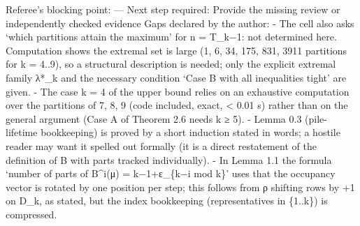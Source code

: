 Referee's blocking point: --- Next step required: Provide the missing
review or independently checked evidence Gaps declared by the author: -
The cell also asks `which partitions attain the maximum' for n = T\_k−1:
not determined here. Computation shows the extremal set is large (1, 6,
34, 175, 831, 3911 partitions for k = 4..9), so a structural description
is needed; only the explicit extremal family λ*\_k and the necessary
condition `Case B with all inequalities tight' are given. - The case k =
4 of the upper bound relies on an exhaustive computation over the
partitions of 7, 8, 9 (code included, exact, \textless{} 0.01 s) rather
than on the general argument (Case A of Theorem 2.6 needs k ≥ 5). -
Lemma 0.3 (pile-lifetime bookkeeping) is proved by a short induction
stated in words; a hostile reader may want it spelled out formally (it
is a direct restatement of the definition of B with parts tracked
individually). - In Lemma 1.1 the formula `number of parts of B\^{}i(μ)
= k−1+ε\_\{k−i mod k\}' uses that the occupancy vector is rotated by one
position per step; this follows from ρ shifting rows by +1 on D\_k, as
stated, but the index bookkeeping (representatives in \{1..k\}) is
compressed.

